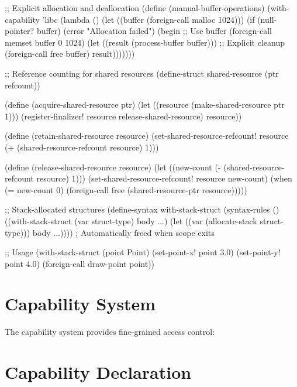 \begin{example}
\begin{lambdustcode}
;; Explicit allocation and deallocation
(define (manual-buffer-operations)
  (with-capability 'libc
    (lambda ()
      (let ((buffer (foreign-call malloc 1024)))
        (if (null-pointer? buffer)
            (error "Allocation failed")
            (begin
              ;; Use buffer
              (foreign-call memset buffer 0 1024)
              (let ((result (process-buffer buffer)))
                ;; Explicit cleanup
                (foreign-call free buffer)
                result)))))))

;; Reference counting for shared resources
(define-struct shared-resource (ptr refcount))

(define (acquire-shared-resource ptr)
  (let ((resource (make-shared-resource ptr 1)))
    (register-finalizer! resource release-shared-resource)
    resource))

(define (retain-shared-resource resource)
  (set-shared-resource-refcount! resource 
    (+ (shared-resource-refcount resource) 1)))

(define (release-shared-resource resource)
  (let ((new-count (- (shared-resource-refcount resource) 1)))
    (set-shared-resource-refcount! resource new-count)
    (when (= new-count 0)
      (foreign-call free (shared-resource-ptr resource)))))

;; Stack-allocated structures
(define-syntax with-stack-struct
  (syntax-rules ()
    ((with-stack-struct (var struct-type) body ...)
     (let ((var (allocate-stack struct-type)))
       body ...))))  ; Automatically freed when scope exits

;; Usage
(with-stack-struct (point Point)
  (set-point-x! point 3.0)
  (set-point-y! point 4.0)
  (foreign-call draw-point point))
\end{lambdustcode}
\end{example}

\section{Capability System}
\label{sec:capabilities}


The capability system provides fine-grained access control:

\section{Capability Declaration}
\label{sec:capability-declaration}

